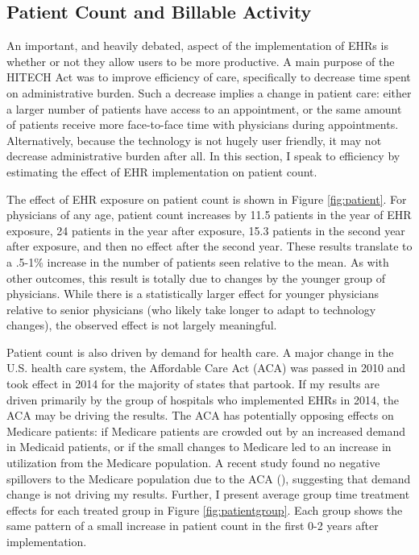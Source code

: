 \documentclass[11pt]{article}
\begin{document}
\subsection{Patient Count and Billable Activity}\label{sec:patientcount}

An important, and heavily debated, aspect of the implementation of EHRs is whether or not they allow users to be more productive. A main purpose of the HITECH Act was to improve efficiency of care, specifically to decrease time spent on administrative burden. Such a decrease implies a change in patient care: either a larger number of patients have access to an appointment, or the same amount of patients receive more face-to-face time with physicians during appointments. Alternatively, because the technology is not hugely user friendly, it may not decrease administrative burden after all. In this section, I speak to efficiency by estimating the effect of EHR implementation on patient count. 

The effect of EHR exposure on patient count is shown in Figure \ref{fig:patient}. For physicians of any age, patient count increases by 11.5 patients in the year of EHR exposure, 24 patients in the year after exposure, 15.3 patients in the second year after exposure, and then no effect after the second year. These results translate to a .5-1\% increase in the number of patients seen relative to the mean. As with other outcomes, this result is totally due to changes by the younger group of physicians. While there is a statistically larger effect for younger physicians relative to senior physicians (who likely take longer to adapt to technology changes), the observed effect is not largely meaningful. 

Patient count is also driven by demand for health care. A major change in the U.S. health care system, the Affordable Care Act (ACA) was passed in 2010 and took effect in 2014 for the majority of states that partook. If my results are driven primarily by the group of hospitals who implemented EHRs in 2014, the ACA may be driving the results. The ACA has potentially opposing effects on Medicare patients: if Medicare patients are crowded out by an increased demand in Medicaid patients, or if the small changes to Medicare led to an increase in utilization from the Medicare population. A recent study found no negative spillovers to the Medicare population due to the ACA (\cite{carey2020impact}), suggesting that demand change is not driving my results. Further, I present average group time treatment effects for each treated group in Figure \ref{fig:patientgroup}. Each group shows the same pattern of a small increase in patient count in the first 0-2 years after implementation. 
\end{document}
